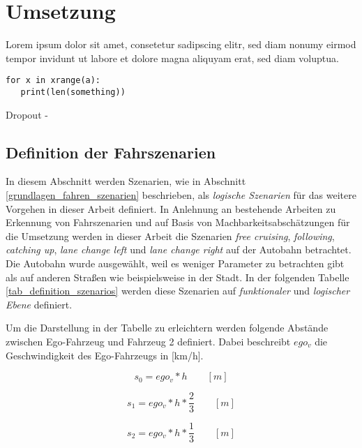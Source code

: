 
\chapter{Umsetzung}
\label{umsetzung}

Lorem ipsum dolor sit amet, consetetur sadipscing elitr, sed diam nonumy eirmod tempor invidunt ut labore et dolore magna aliquyam erat, sed diam voluptua.

\begin{lstlisting}
for x in xrange(a):
   print(len(something))
\end{lstlisting}


Dropout - \cite{hinton2012improving}


\section{Definition der Fahrszenarien}
\label{umsetzung_definition}

In diesem Abschnitt werden Szenarien, wie in Abschnitt \ref{grundlagen_fahren_szenarien} beschrieben, als \textit{logische Szenarien} für das weitere Vorgehen in dieser Arbeit definiert. In Anlehnung an bestehende Arbeiten zu Erkennung von Fahrszenarien und auf Basis von Machbarkeitsabschätzungen für die Umsetzung werden in dieser Arbeit die Szenarien \textit{free cruising}, \textit{following}, \textit{catching up}, \textit{lane change left} und \textit{lane change right} auf der Autobahn betrachtet. Die Autobahn wurde ausgewählt, weil es weniger Parameter zu betrachten gibt als auf anderen Straßen wie beispielsweise in der Stadt. In der folgenden Tabelle \ref{tab_definition_szenarios} werden diese Szenarien auf \textit{funktionaler} und \textit{logischer Ebene} definiert.

Um die Darstellung in der Tabelle zu erleichtern werden folgende Abstände zwischen Ego-Fahrzeug und Fahrzeug 2 definiert. Dabei beschreibt $ego_v$ die Geschwindigkeit des Ego-Fahrzeugs in [km/h].

\begin{equation}
s_0 = ego_v * h \qquad [m]
\end{equation}

\begin{equation}
s_1 = ego_v * h * \frac{2}{3} \qquad [m]
\end{equation}

\begin{equation}
s_2 = ego_v * h * \frac{1}{3} \qquad [m]
\end{equation}

